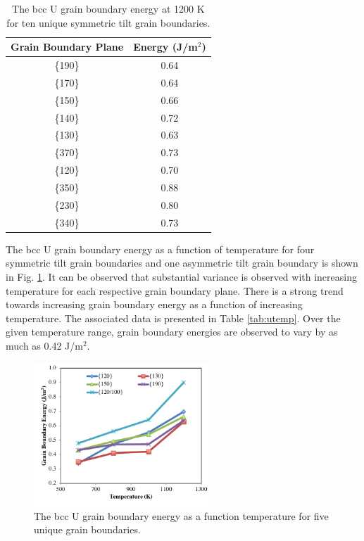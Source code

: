 \documentclass[review]{elsarticle}
\begin{document}
\begin{table}[h]
\caption{The bcc U grain boundary energy at 1200 K for ten unique symmetric tilt grain boundaries.} \label{tab:u1200}
\begin{center}
\begin{tabular}{|c|c|}
	\hline
	Grain Boundary Plane & Energy (J/m$^{2}$) \\
	 \hline
	 \{190\} & 0.64 \\
	 \{170\} & 0.64 \\
	 \{150\} & 0.66 \\
	 \{140\} & 0.72 \\
	 \{130\} & 0.63 \\	 
	 \{370\} & 0.73 \\
	 \{120\} & 0.70 \\
	 \{350\} & 0.88 \\
	 \{230\} & 0.80 \\
	 \{340\} & 0.73 \\
	 \hline
\end{tabular}
\end{center}
\label{default}
\end{table}

\FloatBarrier

The bcc U grain boundary energy as a function of temperature for four symmetric tilt grain boundaries and one asymmetric tilt grain boundary is shown in Fig. \ref{fig:utemp}. It can be observed that substantial variance is observed with increasing temperature for each respective grain boundary plane. There is a strong trend towards increasing grain boundary energy as a function of increasing temperature. The associated data is presented in Table \ref{tab:utemp}. Over the given temperature range, grain boundary energies are observed to vary by as much as 0.42 J/m$^{2}$. 

\begin{figure}[h]
 \centering
 \includegraphics[width=0.6\textwidth]{u_temp.png} 
 \caption{The bcc U grain boundary energy as a function temperature for five unique grain boundaries.}
 \label{fig:utemp}
\end{figure}
\end{document}
